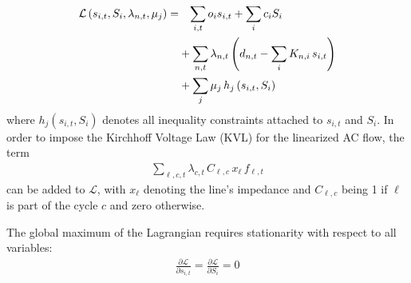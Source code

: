 \documentclass[11pt,twocolumn]{article}
\newcommand{\ubar}[1]{\underaccent{\bar}{#1}}
\newcommand{\pdv}[2]{\frac{\partial #1}{\partial #2}}
\newcommand{\state}{s_{i,t}}
\newcommand{\capacity}{S_{i}}
\newcommand{\generation}{g_{s,t}}
\newcommand{\generationpotential}{\bar{g}_{s,t}}
\newcommand{\capacitygeneration}{G_{s}}
\newcommand{\operationalpricegeneration}{o_{s}}
\newcommand{\capitalpricegeneration}{c_{s}}
\newcommand{\mulowergeneration}{\ubar{\mu}_{s,t}}
\newcommand{\muuppergeneration}{\bar{\mu}_{s,t}}
\newcommand{\flow}{f_{\ell,t}}
\newcommand{\capacityflow}{F_{\ell}}
\newcommand{\capitalpriceflow}{c_{\ell}}
\newcommand{\mulowerflow}{\ubar{\mu}_{\ell,t}}
\newcommand{\muupperflow}{\bar{\mu}_{\ell,t}}
\newcommand{\lagrangian}{\mathcal{L}}
\newcommand{\lmp}[1][n]{\lambda_{#1,t}}
\newcommand{\demand}[1][n]{d_{#1,t}}
\newcommand{\incidence}[1][n]{K_{#1,\ell}}
\newcommand{\incidencegenerator}[1][n]{K_{#1,s}}
\newcommand{\incidenceasset}[1][n]{K_{#1,i}}
\newcommand{\cycle}{C_{\ell,c}}
\newcommand{\reactance}{x_\ell}
\newcommand{\cycleprice}{\lambda_{c,t}}
\begin{document}
\begin{align}
\notag
 \lagrangian\left(\state, \capacity, \lmp, \mu_j \right) =& 
 \;\;\; \sum_{i,t} o_i \state + \sum_{i} c_i \capacity  \\
\notag
&+  \sum_{n,t} \lmp \left( \demand - \sum_i \incidenceasset \, \state \right) \\
&+ \sum_j \mu_j \, h_j \left(\state, \capacity \right)
\label{eq:full_lagrangian}
\end{align}
where $h_j \left(\state, \capacity \right)$ denotes all inequality constraints attached to $\state$ and $\capacity$.
% 
% 
In order to impose the Kirchhoff Voltage Law (KVL) for the linearized AC flow, the term 
\begin{align}
    \sum_{\ell,c,t} \cycleprice \, \cycle \, \reactance \, \flow 
\end{align}
can be added to $\lagrangian$, with $\reactance$ denoting the line's impedance and $\cycle$ being 1 if $\ell$ is part of the cycle $c$ and zero otherwise.

The global maximum of the Lagrangian requires stationarity with respect to all variables:
\begin{align}
    \pdv{\lagrangian}{\state} = \pdv{\lagrangian}{\capacity} = 0    
\end{align} 
\end{document}
